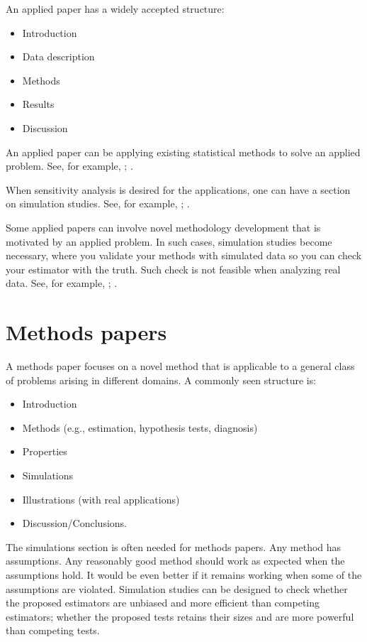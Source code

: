 \documentclass[
]{book}
\providecommand{\tightlist}{%
  \setlength{\itemsep}{0pt}\setlength{\parskip}{0pt}}
\theoremstyle{definition}
\theoremstyle{definition}
\theoremstyle{definition}
\theoremstyle{definition}
\theoremstyle{remark}
\begin{document}
An applied paper has a widely accepted structure:

\begin{itemize}
\tightlist
\item
  Introduction
\item
  Data description
\item
  Methods
\item
  Results
\item
  Discussion
\end{itemize}

An applied paper can be applying existing statistical methods to solve an
applied problem. See, for example, \citet{price2022effects}; \citet{caplan2019dental}.

When sensitivity analysis is desired for the applications, one can have a
section on simulation studies. See, for example, \citet{jiao2022cyberattack};
\citet{li2021uncertainty}.

Some applied papers can involve novel methodology development that is motivated
by an applied problem. In such cases, simulation studies become necessary, where
you validate your methods with simulated data so you can check your estimator
with the truth. Such check is not feasible when analyzing real data.
See, for example, \citet{jiao2021bayesian}; \citet{hu2021moving}.

\section{Methods papers}\label{methods-papers}

A methods paper focuses on a novel method that is applicable to a general class
of problems arising in different domains. A commonly seen structure is:

\begin{itemize}
\tightlist
\item
  Introduction
\item
  Methods (e.g., estimation, hypothesis tests, diagnosis)
\item
  Properties
\item
  Simulations
\item
  Illustrations (with real applications)
\item
  Discussion/Conclusions.
\end{itemize}

The simulations section is often needed for methods papers. Any method has
assumptions. Any reasonably good method should work as expected when the
assumptions hold. It would be even better if it remains working when some of the
assumptions are violated. Simulation studies can be designed to check whether
the proposed estimators are unbiased and more efficient than competing
estimators; whether the proposed tests retains their sizes and are more powerful
than competing tests.
\end{document}
